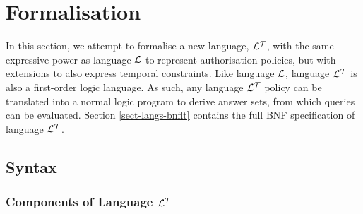 \documentclass[11pt]{report}
\begin{document}
    \section{Formalisation}
       \label{sect-tempo-fmstn}

      In this section, we attempt to formalise a new language, ${\cal L^T}$,
      with the same expressive power as language ${\cal L}$ to represent
      authorisation policies, but with extensions to also express temporal
      constraints. Like language ${\cal L}$, language ${\cal L^T}$ is also a
      first-order logic language. As such, any language ${\cal L^T}$ policy
      can be translated into a normal logic program to derive answer sets,
      from which queries can be evaluated. Section \ref{sect-langs-bnflt}
      contains the full BNF specification of language ${\cal L^T}$.

      \subsection{Syntax}
        \label{subs-tempo-syntx}

        \subsubsection{Components of Language ${\cal L^T}$}
\end{document}
